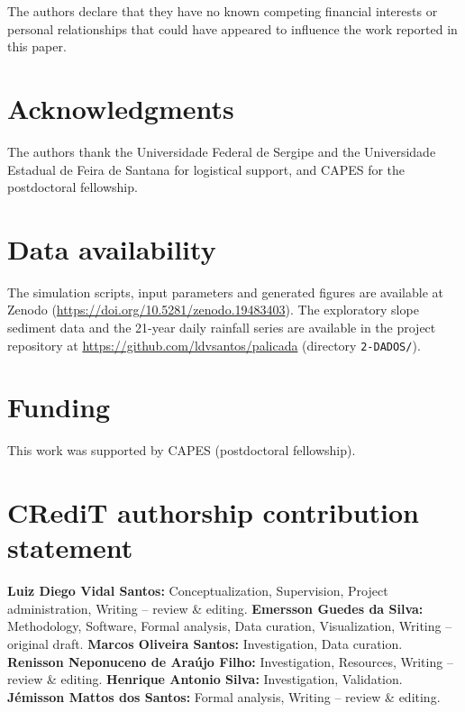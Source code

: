 \documentclass[preprint,review,12pt,authoryear]{elsarticle}
\begin{document}
The authors declare that they have no known competing financial interests or personal relationships that could have appeared to influence the work reported in this paper.

\section*{Acknowledgments}

The authors thank the Universidade Federal de Sergipe and the Universidade Estadual de Feira de Santana for logistical support, and CAPES for the postdoctoral fellowship.

\section*{Data availability}

The simulation scripts, input parameters and generated figures are available at Zenodo (\url{https://doi.org/10.5281/zenodo.19483403}). The exploratory slope sediment data and the 21-year daily rainfall series are available in the project repository at \url{https://github.com/ldvsantos/palicada} (directory \texttt{2-DADOS/}).

\section*{Funding}

This work was supported by CAPES (postdoctoral fellowship).

\section*{CRediT authorship contribution statement}

\textbf{Luiz Diego Vidal Santos:} Conceptualization, Supervision, Project administration, Writing -- review \& editing. \textbf{Emersson Guedes da Silva:} Methodology, Software, Formal analysis, Data curation, Visualization, Writing -- original draft. \textbf{Marcos Oliveira Santos:} Investigation, Data curation. \textbf{Renisson Neponuceno de Ara\'{u}jo Filho:} Investigation, Resources, Writing -- review \& editing. \textbf{Henrique Antonio Silva:} Investigation, Validation. \textbf{J\'{e}misson Mattos dos Santos:} Formal analysis, Writing -- review \& editing.
\end{document}
